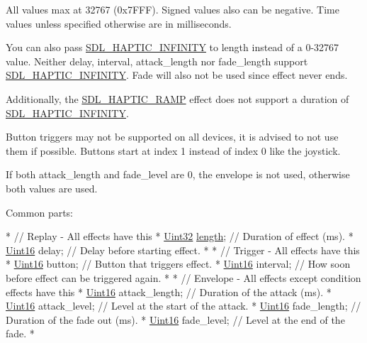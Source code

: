 All values max at 32767 (0x7\-F\-F\-F). Signed values also can be negative. Time values unless specified otherwise are in milliseconds.

You can also pass \hyperlink{_s_d_l__haptic_8h_a648896e9e14cb27fa8a4b6632d3f3882}{S\-D\-L\-\_\-\-H\-A\-P\-T\-I\-C\-\_\-\-I\-N\-F\-I\-N\-I\-T\-Y} to length instead of a 0-\/32767 value. Neither delay, interval, attack\-\_\-length nor fade\-\_\-length support \hyperlink{_s_d_l__haptic_8h_a648896e9e14cb27fa8a4b6632d3f3882}{S\-D\-L\-\_\-\-H\-A\-P\-T\-I\-C\-\_\-\-I\-N\-F\-I\-N\-I\-T\-Y}. Fade will also not be used since effect never ends.

Additionally, the \hyperlink{_s_d_l__haptic_8h_af10eb937a64a8f602e9c46682ac0d868}{S\-D\-L\-\_\-\-H\-A\-P\-T\-I\-C\-\_\-\-R\-A\-M\-P} effect does not support a duration of \hyperlink{_s_d_l__haptic_8h_a648896e9e14cb27fa8a4b6632d3f3882}{S\-D\-L\-\_\-\-H\-A\-P\-T\-I\-C\-\_\-\-I\-N\-F\-I\-N\-I\-T\-Y}.

Button triggers may not be supported on all devices, it is advised to not use them if possible. Buttons start at index 1 instead of index 0 like the joystick.

If both attack\-\_\-length and fade\-\_\-level are 0, the envelope is not used, otherwise both values are used.

Common parts\-: 
\begin{DoxyCode}
*  \textcolor{comment}{// Replay - All effects have this}
*  \hyperlink{_s_d_l__stdinc_8h_add440eff171ea5f55cb00c4a9ab8672d}{Uint32} \hyperlink{_g_l_e_w_2glew_8h_a1499969c13207ed8ab6f796685d4933f}{length};        \textcolor{comment}{// Duration of effect (ms).}
*  \hyperlink{_s_d_l__stdinc_8h_a31fcc0a076c9068668173ee26d33e42b}{Uint16} delay;         \textcolor{comment}{// Delay before starting effect.}
*
*  \textcolor{comment}{// Trigger - All effects have this}
*  \hyperlink{_s_d_l__stdinc_8h_a31fcc0a076c9068668173ee26d33e42b}{Uint16} button;        \textcolor{comment}{// Button that triggers effect.}
*  \hyperlink{_s_d_l__stdinc_8h_a31fcc0a076c9068668173ee26d33e42b}{Uint16} interval;      \textcolor{comment}{// How soon before effect can be triggered again.}
*
*  \textcolor{comment}{// Envelope - All effects except condition effects have this}
*  \hyperlink{_s_d_l__stdinc_8h_a31fcc0a076c9068668173ee26d33e42b}{Uint16} attack\_length; \textcolor{comment}{// Duration of the attack (ms).}
*  \hyperlink{_s_d_l__stdinc_8h_a31fcc0a076c9068668173ee26d33e42b}{Uint16} attack\_level;  \textcolor{comment}{// Level at the start of the attack.}
*  \hyperlink{_s_d_l__stdinc_8h_a31fcc0a076c9068668173ee26d33e42b}{Uint16} fade\_length;   \textcolor{comment}{// Duration of the fade out (ms).}
*  \hyperlink{_s_d_l__stdinc_8h_a31fcc0a076c9068668173ee26d33e42b}{Uint16} fade\_level;    \textcolor{comment}{// Level at the end of the fade.}
*  
\end{DoxyCode}


